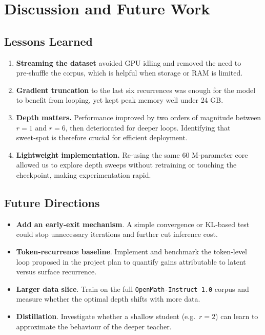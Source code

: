 \chapter{Discussion and Future Work}\label{ch:discussion}

\section{Lessons Learned}

\begin{enumerate}
    \item \textbf{Streaming the dataset} avoided GPU idling and removed the need to pre‑shuffle the corpus, which is helpful when storage or RAM is limited.
    \item \textbf{Gradient truncation} to the last six recurrences was enough for the model to benefit from looping, yet kept peak memory well under 24 GB.
    \item \textbf{Depth matters.}  Performance improved by two orders of
          magnitude between \(r=1\) and \(r=6\), then deteriorated for
          deeper loops.  Identifying that sweet‑spot is therefore crucial
          for efficient deployment.
    \item \textbf{Lightweight implementation.}  Re‑using the same
          60 M‑parameter core allowed us to explore depth sweeps without
          retraining or touching the checkpoint, making experimentation
          rapid.
\end{enumerate}

\section{Future Directions}

\begin{itemize}
    \item \textbf{Add an early‑exit mechanism}.  
          A simple convergence or KL‑based test could stop unnecessary iterations and further cut inference cost.
    \item \textbf{Token‑recurrence baseline}.  
          Implement and benchmark the token‑level loop proposed in the
          project plan to quantify gains attributable to latent versus
          surface recurrence.
    \item \textbf{Larger data slice}.  
          Train on the full \texttt{OpenMath‑Instruct 1.0} corpus and measure whether the optimal depth shifts with more data.
    \item \textbf{Distillation}.  
          Investigate whether a shallow student (e.g.\ \(r=2\))
          can learn to approximate the behaviour of the deeper teacher.
\end{itemize}

